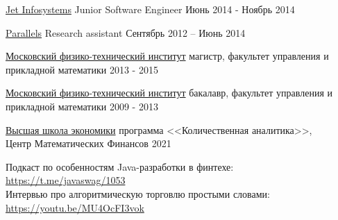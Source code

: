 \documentclass[12pt,a4paper]{article}
\begin{document}
\smallskip


\headedsection
  {\href{http://www.jet.msk.su/}{Jet Infosystems}}
  {\textsc{}}  {%
  \headedsubsection
    {Junior Software Engineer}
    {Июнь 2014 - Ноябрь 2014}
    \smallskip
    {
    }}

\smallskip
\headedsection
  {\href{http://www.parallels.com}{Parallels}}
  {\textsc{}} {%
  \headedsubsection
    {Research assistant}
    {Сентябрь 2012 -- Июнь 2014}
    \smallskip
    {}
    }
\spacedhrule{0em}{-1em}

\headedsection
  {\href{http://mipt.ru/}{Московский физико-технический институт}}
  {\textsc{}}  {%
  \headedsubsection
    {магистр, факультет управления и прикладной математики}
    {2013 - 2015}
    \smallskip
    }

\headedsection
  {\href{http://mipt.ru/}{Московский физико-технический институт}}
  {\textsc{}}  {%
  \headedsubsection
    {бакалавр, факультет управления и прикладной математики}
    {2009 - 2013}
    \smallskip
    }

\headedsection
  {\href{https://iqf.hse.ru/cmf}{Высшая школа экономики}}
  {\textsc{}}  {%
  \headedsubsection
    {программа <<Количественная аналитика>>,\\ Центр Математических Финансов}
    {2021}
    \smallskip
    }


\spacedhrule{0em}{-1em}

  Подкаст по особенностям Java-разработки в финтехе: {\href{https://t.me/javaswag/1053}{https://t.me/javaswag/1053}}
  \\
  Интервью про алгоритмическую торговлю простыми словами: {\href{https://youtu.be/MU4OcFI3vok}{https://youtu.be/MU4OcFI3vok}}
\end{document}
